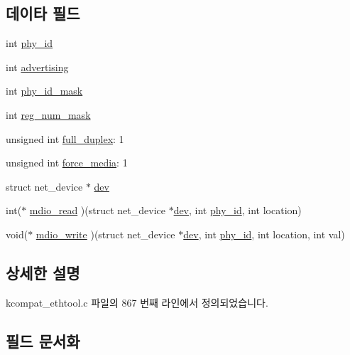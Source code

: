 \subsection*{데이타 필드}
\begin{DoxyCompactItemize}
\item 
int \hyperlink{struct__kc__mii__if__info_a34859205e0eb74ee40d1168c78244146}{phy\+\_\+id}
\item 
int \hyperlink{struct__kc__mii__if__info_a325f793290a1bcf9f48639146ef529f6}{advertising}
\item 
int \hyperlink{struct__kc__mii__if__info_a24aee225a18d3893088ea87146dfb3d0}{phy\+\_\+id\+\_\+mask}
\item 
int \hyperlink{struct__kc__mii__if__info_a90947234b59deb110e0c9f322f1f1104}{reg\+\_\+num\+\_\+mask}
\item 
unsigned int \hyperlink{struct__kc__mii__if__info_a6c5ff5f0d7818e5e008086f4e0611b34}{full\+\_\+duplex}\+: 1
\item 
unsigned int \hyperlink{struct__kc__mii__if__info_a8b35d1c3e6ba76ee47536214bf78eed0}{force\+\_\+media}\+: 1
\item 
struct net\+\_\+device $\ast$ \hyperlink{struct__kc__mii__if__info_abf690dbcccc005ba94a1ce16864ccdc9}{dev}
\item 
int($\ast$ \hyperlink{struct__kc__mii__if__info_a70c302608dc8bf60598bc3ffd5180cf4}{mdio\+\_\+read} )(struct net\+\_\+device $\ast$\hyperlink{struct__kc__mii__if__info_abf690dbcccc005ba94a1ce16864ccdc9}{dev}, int \hyperlink{struct__kc__mii__if__info_a34859205e0eb74ee40d1168c78244146}{phy\+\_\+id}, int location)
\item 
void($\ast$ \hyperlink{struct__kc__mii__if__info_ab5c763f19125b020077d0ff496dbc635}{mdio\+\_\+write} )(struct net\+\_\+device $\ast$\hyperlink{struct__kc__mii__if__info_abf690dbcccc005ba94a1ce16864ccdc9}{dev}, int \hyperlink{struct__kc__mii__if__info_a34859205e0eb74ee40d1168c78244146}{phy\+\_\+id}, int location, int val)
\end{DoxyCompactItemize}


\subsection{상세한 설명}


kcompat\+\_\+ethtool.\+c 파일의 867 번째 라인에서 정의되었습니다.



\subsection{필드 문서화}
